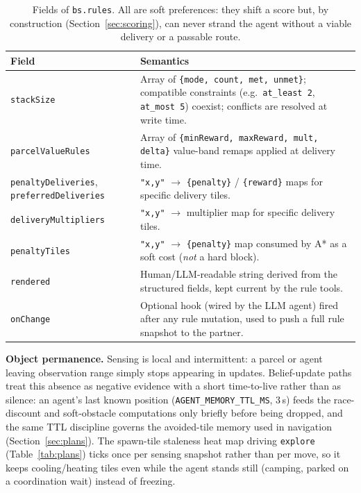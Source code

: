 \documentclass[11pt,a4paper]{article}
\renewcommand{\paragraph}[1]{\par\smallskip\noindent\textbf{#1}}
\begin{document}
\begin{table}[htbp]
\centering
\footnotesize
\begin{tabular}{@{}p{3.0cm}p{9.0cm}@{}}
\toprule
\textbf{Field} & \textbf{Semantics} \\
\midrule
\texttt{stackSize} & Array of \texttt{\{mode, count, met, unmet\}}; compatible constraints (e.g.\ \texttt{at\_least 2}, \texttt{at\_most 5}) coexist; conflicts are resolved at write time. \\
\texttt{parcelValueRules} & Array of \texttt{\{minReward, maxReward, mult, delta\}} value-band remaps applied at delivery time. \\
\texttt{penaltyDeliveries}, \texttt{preferredDeliveries} & \texttt{"x,y"} $\to$ \texttt{\{penalty\}} / \texttt{\{reward\}} maps for specific delivery tiles. \\
\texttt{deliveryMultipliers} & \texttt{"x,y"} $\to$ multiplier map for specific delivery tiles. \\
\texttt{penaltyTiles} & \texttt{"x,y"} $\to$ \texttt{\{penalty\}} map consumed by A* as a soft cost (\emph{not} a hard block). \\
\texttt{rendered} & Human/LLM-readable string derived from the structured fields, kept current by the rule tools. \\
\texttt{onChange} & Optional hook (wired by the LLM agent) fired after any rule mutation, used to push a full rule snapshot to the partner. \\
\bottomrule
\end{tabular}
\caption{Fields of \texttt{bs.rules}. All are soft preferences: they shift a score but, by
construction (Section~\ref{sec:scoring}), can never strand the agent without a viable
delivery or a passable route.}
\label{tab:rules-fields}
\end{table}

\paragraph{Object permanence.} Sensing is local and intermittent: a parcel or agent leaving
observation range simply stops appearing in updates. Belief-update paths treat this absence as
negative evidence with a short time-to-live rather than as silence: an agent's last known
position (\texttt{AGENT\_MEMORY\_TTL\_MS}, 3\,s) feeds the race-discount and soft-obstacle
computations only briefly before being dropped, and the same TTL discipline governs the
avoided-tile memory used in navigation (Section~\ref{sec:plans}). The spawn-tile staleness heat
map driving \texttt{explore} (Table~\ref{tab:plans}) ticks once per sensing snapshot rather than
per move, so it keeps cooling/heating tiles even while the agent stands still (camping, parked on
a coordination wait) instead of freezing.
\end{document}

